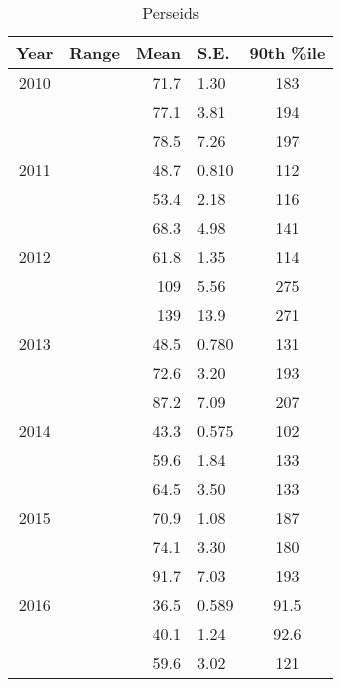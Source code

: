 \begin{table}[h!]
	\centering
	\begin{tabular}{|c|c|r@{ \,$\pm$\, }l|c|}
		\hline 
		Year & Range & Mean & S.E. & 90th \%ile\\ 
		\hline 
		2010 & & 71.7 & 1.30 & 183   \\ 
		\hline 
		& &	77.1 & 3.81 & 194   \\ 
		\hline 
		& & 78.5 & 7.26 & 197   \\ 
		\hline 
		2011 & & 48.7 & 0.810 & 112   \\ 
		\hline 
		& & 53.4 & 2.18 & 116   \\ 
		\hline 
		& & 68.3 & 4.98 & 141   \\ 
		\hline 
		2012 & & 61.8 & 1.35 & 114   \\ 
		\hline 
		& & 109 & 5.56 & 275   \\ 
		\hline 
		& & 139 & 13.9 & 271   \\ 
		\hline 
		2013 & & 48.5 & 0.780 & 131   \\ 
		\hline 
		& & 72.6 & 3.20 & 193   \\ 
		\hline 
		& & 87.2 & 7.09 & 207   \\ 
		\hline 
		2014 & & 43.3 & 0.575 & 102   \\ 
		\hline 
		& & 59.6 & 1.84 & 133   \\ 
		\hline 
		& & 64.5 & 3.50 & 133  \\ 
		\hline 
		2015 & & 70.9 & 1.08 & 187   \\ 
		\hline 
		& & 74.1 & 3.30 & 180   \\ 
		\hline 
		& & 91.7 & 7.03 & 193   \\ 
		\hline
		2016 & & 36.5 & 0.589 & 91.5	\\
		\hline 
		& & 40.1 & 1.24 & 92.6   \\ 
		\hline 
		& & 59.6 & 3.02 & 121   \\ 
		\hline 
	\end{tabular}
	\caption{Perseids} 
\end{table}

